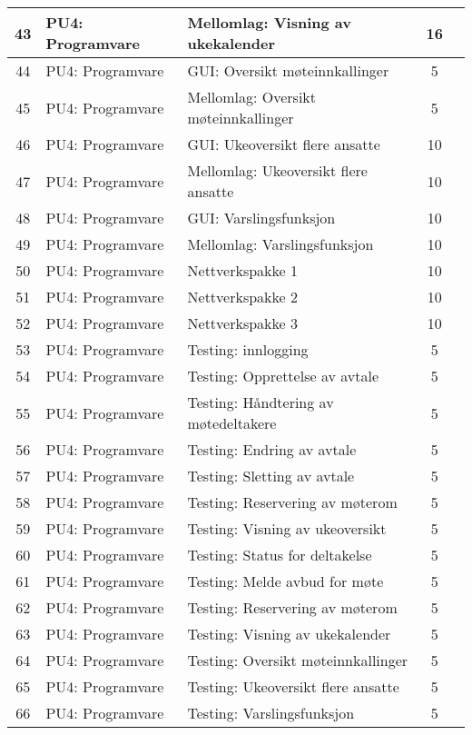 \begin{table}
{\begin{tabularx}{1.3\textwidth}{|c|l|X|c|c|}
	43 & PU4: Programvare & Mellomlag: Visning av ukekalender  & 16 & \\ \hline
	44 & PU4: Programvare & GUI: Oversikt møteinnkallinger & 5 & \\ \hline
	45 & PU4: Programvare & Mellomlag: Oversikt møteinnkallinger  & 5 & \\ \hline
	46 & PU4: Programvare & GUI: Ukeoversikt flere ansatte & 10 & \\ \hline
	47 & PU4: Programvare & Mellomlag: Ukeoversikt flere ansatte  & 10 & \\ \hline
	48 & PU4: Programvare & GUI: Varslingsfunksjon & 10 & \\ \hline
	49 & PU4: Programvare & Mellomlag: Varslingsfunksjon & 10 & \\ \hline
	50 & PU4: Programvare & Nettverkspakke 1 & 10 & \\ \hline
	51 & PU4: Programvare & Nettverkspakke 2 & 10 & \\ \hline
	52 & PU4: Programvare & Nettverkspakke 3 & 10 & \\ \hline
	53 & PU4: Programvare & Testing: innlogging & 5 & \\ \hline
	54 & PU4: Programvare & Testing: Opprettelse av avtale & 5 & \\ \hline
	55 & PU4: Programvare & Testing: Håndtering av møtedeltakere & 5 & \\ \hline
	56 & PU4: Programvare & Testing: Endring av avtale & 5 & \\  \hline
	57 & PU4: Programvare & Testing: Sletting av avtale & 5 & \\ \hline
	58 & PU4: Programvare & Testing: Reservering av møterom & 5 & \\ \hline
	59 & PU4: Programvare & Testing: Visning av ukeoversikt & 5 & \\ \hline
	60 & PU4: Programvare & Testing: Status for deltakelse & 5 & \\ \hline
	61 & PU4: Programvare & Testing: Melde avbud for møte & 5 & \\ \hline
	62 & PU4: Programvare & Testing: Reservering av møterom & 5 & \\ \hline
	63 & PU4: Programvare & Testing: Visning av ukekalender & 5 & \\ \hline
	64 & PU4: Programvare & Testing: Oversikt møteinnkallinger & 5 & \\ \hline
	65 & PU4: Programvare & Testing: Ukeoversikt flere ansatte & 5 & \\ \hline
	66 & PU4: Programvare & Testing: Varslingsfunksjon & 5 & \\ \hline

\end{tabularx}}
\end{table}
